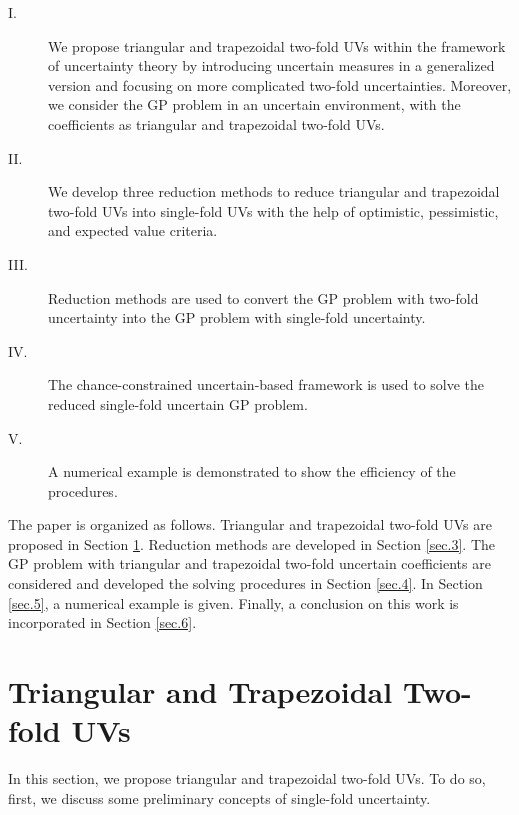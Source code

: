 \begin{description}
	\item[I.] We propose triangular and trapezoidal two-fold UVs within the framework of uncertainty theory by introducing uncertain measures in a generalized version and focusing on more complicated two-fold uncertainties. Moreover, we consider the GP problem in an uncertain environment, with the coefficients as triangular and trapezoidal two-fold UVs. 
	\item[II.]  We develop three reduction methods to reduce triangular and trapezoidal two-fold UVs into single-fold UVs with the help of optimistic, pessimistic, and expected value criteria. 
	\item[III.] Reduction methods are used to convert the GP problem with two-fold uncertainty into the GP problem with single-fold uncertainty. 
	\item[IV.] The chance-constrained uncertain-based framework is used to solve the reduced single-fold uncertain GP problem. 
	\item[V.]  A numerical example is demonstrated to show the efficiency of the procedures.
\end{description}
\par The paper is organized as follows. Triangular and trapezoidal two-fold UVs are proposed in Section \ref{sec.2}. Reduction methods are developed in Section \ref{sec.3}. The GP problem with triangular and trapezoidal two-fold uncertain coefficients are considered and developed the solving procedures in Section \ref{sec.4}. In Section \ref{sec.5}, a numerical example is given. Finally, a conclusion on this work is incorporated in Section \ref{sec.6}.
\section{Triangular and Trapezoidal Two-fold UVs}\label{sec.2} 
In this section, we propose triangular and trapezoidal two-fold UVs. To do so, first, we discuss some preliminary concepts of single-fold uncertainty.
